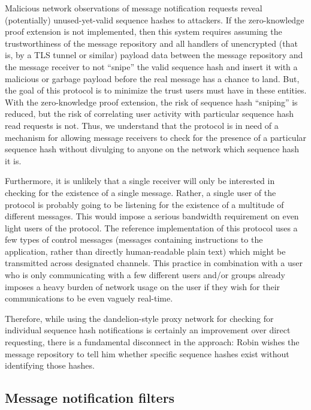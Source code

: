 Malicious network observations of message notification requests reveal (potentially) unused-yet-valid sequence hashes to attackers. If the zero-knowledge proof extension is not implemented, then this system requires assuming the trustworthiness of the message repository and all handlers of unencrypted (that is, by a TLS tunnel or similar) payload data between the message repository and the message receiver to not ``snipe'' the valid sequence hash and insert it with a malicious or garbage payload before the real message has a chance to land. But, the goal of this protocol is to minimize the trust users must have in these entities. With the zero-knowledge proof extension, the risk of sequence hash ``sniping'' is reduced, but the risk of correlating user activity with particular sequence hash read requests is not. Thus, we understand that the protocol is in need of a mechanism for allowing message receivers to check for the presence of a particular sequence hash without divulging to anyone on the network which sequence hash it is.

Furthermore, it is unlikely that a single receiver will only be interested in checking for the existence of a single message. Rather, a single user of the protocol is probably going to be listening for the existence of a multitude of different messages. This would impose a serious bandwidth requirement on even light users of the protocol. The reference implementation of this protocol uses a few types of control messages (messages containing instructions to the application, rather than directly human-readable plain text) which might be transmitted across designated channels. This practice in combination with a user who is only communicating with a few different users and/or groups already imposes a heavy burden of network usage on the user if they wish for their communications to be even vaguely real-time.

Therefore, while using the dandelion-style proxy network for checking for individual sequence hash notifications is certainly an improvement over direct requesting, there is a fundamental disconnect in the approach: Robin wishes the message repository to tell him whether specific sequence hashes exist without identifying those hashes.

\subsection{Message notification filters}\label{message-notification-filters}

